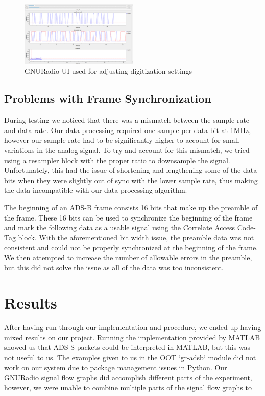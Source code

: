 \documentclass[conference, onecolumn]{IEEEtran}
\begin{document}
\begin{figure}
  \begin{center}
    \includegraphics[width=0.5\textwidth]{./figures/fig_gnuradio_fullUI.png}
  \end{center}
  \caption{GNURadio UI used for adjusting digitization settings}\label{fig:receive_UI}
\end{figure}

\subsection{Problems with Frame Synchronization}
During testing we noticed that there was a mismatch between the sample rate and data rate. Our data processing required one sample per data bit at 1MHz, however our sample rate had to be significantly higher to account for small variations in the analog signal. To try and account for this mismatch, we tried using a resampler block with the proper ratio to downsample the signal. Unfortunately, this had the issue of shortening and lengthening some of the data bits when they were slightly out of sync with the lower sample rate, thus making the data incompatible with our data processing algorithm.

The beginning of an ADS-B frame consists 16 bits that make up the preamble of the frame. These 16 bits can be used to synchronize the beginning of the frame and mark the following data as a usable signal using the Correlate Access Code-Tag block. With the aforementioned bit width issue, the preamble data was not consistent and could not be properly synchronized at the beginning of the frame. We then attempted to increase the number of allowable errors in the preamble, but this did not solve the issue as all of the data was too inconsistent.

\section{Results}
After having run through our implementation and procedure, we ended up having mixed results on our project. Running the implementation provided by MATLAB showed us that ADS-S packets could be interpreted in MATLAB, but this was not useful to us. The examples given to us in the OOT `gr-adsb` module did not work on our system due to package management issues in Python. Our GNURadio signal flow graphs did accomplish different parts of the experiment, however, we were unable to combine multiple parts of the signal flow graphs to 
\end{document}

